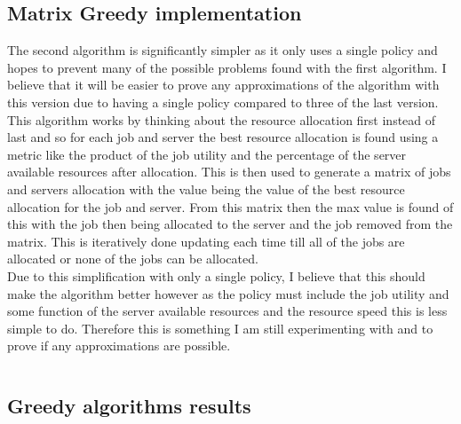\subsection{Matrix Greedy implementation}\label{subsec:matrix-greedy-implementation}
The second algorithm is significantly simpler as it only uses a single policy and hopes to prevent many of the possible
problems found with the first algorithm. I believe that it will be easier to prove any approximations of the algorithm
with this version due to having a single policy compared to three of the last version. \\
This algorithm works by thinking about the resource allocation first instead of last and so for each job and server
the best resource allocation is found using a metric like the product of the job utility and the percentage of the server
available resources after allocation. This is then used to generate a matrix of jobs and servers allocation with the value
being the value of the best resource allocation for the job and server. From this matrix then the max value is found of this
with the job then being allocated to the server and the job removed from the matrix. This is iteratively done updating each
time till all of the jobs are allocated or none of the jobs can be allocated. \\
Due to this simplification with only a single policy, I believe that this should make the algorithm better however as the
policy must include the job utility and some function of the server available resources and the resource speed this is
less simple to do. Therefore this is something I am still experimenting with and to prove if any \epsilon approximations are possible.

\begin{lstlisting}[language=Python]
%% TODO
\end{lstlisting}

\subsection{Greedy algorithms results}\label{subsec:greedy-algorithms-results}
